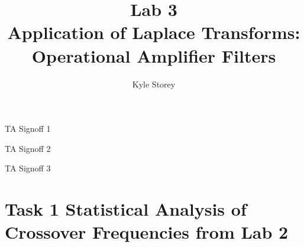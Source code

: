 \documentclass[12pt]{article}
\title{Lab 3\\Application of Laplace Transforms: Operational Amplifier Filters}
\author{Kyle Storey}
\begin{document}
\maketitle

\vspace{30pt}
TA Signoff 1 \hrulefill

\vspace{30pt}
TA Signoff 2 \hrulefill

\vspace{30pt}
TA Signoff 3 \hrulefill

\pagebreak

\section{Task 1 Statistical Analysis of Crossover Frequencies from Lab 2}
\end{document}
